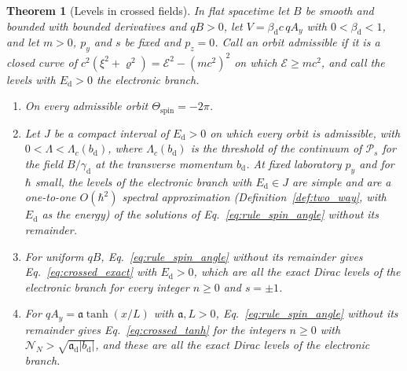 \documentclass[aps,prd,onecolumn,tightenlines,nofootinbib,notitlepage,11pt,floatfix]{revtex4-2}
\theoremstyle{indentedtheorem}
\newtheorem{theorem}{Theorem}
\begin{document}
\begin{theorem}[Levels in crossed fields]
\label{thm:levels_crossed}
In flat spacetime let $B$ be smooth and bounded with bounded derivatives and $qB>0$, let $V=\beta_\text{d}c\,qA_y$ with $0<\beta_\text{d}<1$, and let $m>0$, $p_y$ and $s$ be fixed and $p_z=0$. Call an orbit admissible if it is a closed curve of $c^2(\xi^2+\varrho^2)=\mathcal{E}^2-(mc^2)^2$ on which $\mathcal{E}\geq mc^2$, and call the levels with $E_\text{d}>0$ the \emph{electronic branch}.
\begin{enumerate}
\item[(a)] On every admissible orbit $\Theta_\text{spin}=-2\pi$.
\item[(b)] Let $J$ be a compact interval of $E_\text{d}>0$ on which every orbit is admissible, with $0<\Lambda<\Lambda_c(b_\text{d})$, where $\Lambda_c(b_\text{d})$ is the threshold of the continuum of $\mathcal{P}_s$ for the field $B/\gamma_\text{d}$ at the transverse momentum $b_\text{d}$. At fixed laboratory $p_y$ and for $\hbar$ small, the levels of the electronic branch with $E_\text{d}\in J$ are simple and are a one-to-one $O(\hbar^2)$ spectral approximation (Definition~\ref{def:two_way}, with $E_\text{d}$ as the energy) of the solutions of Eq.~\eqref{eq:rule_spin_angle} without its remainder.
\item[(c)] For uniform $qB$, Eq.~\eqref{eq:rule_spin_angle} without its remainder gives Eq.~\eqref{eq:crossed_exact} with $E_\text{d}>0$, which are all the exact Dirac levels of the electronic branch for every integer $n\geq0$ and $s=\pm1$.
\item[(d)] For $qA_y=\mathfrak{a}\tanh(x/L)$ with $\mathfrak{a},L>0$, Eq.~\eqref{eq:rule_spin_angle} without its remainder gives Eq.~\eqref{eq:crossed_tanh} for the integers $n\geq0$ with $\mathcal{N}_N>\sqrt{\mathfrak{a}_\text{d}|b_\text{d}|}$, and these are all the exact Dirac levels of the electronic branch.
\end{enumerate}
\end{theorem}
\end{document}
